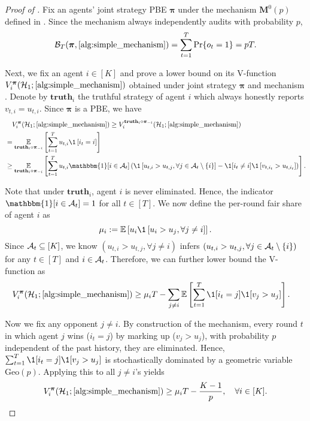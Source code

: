 \begin{proof}[Proof of ]
Fix an agents' joint strategy PBE $\bm \pi$ under the mechanism $\bm M^0(p)$ defined in . Since the mechanism always independently audits with probability $p$,
\begin{equation*}
    \mathcal B_T(\bm \pi,\text{\Cref{alg:simple_mechanism}}) = \sum_{t=1}^T \Pr\{o_t=1\} = pT.
\end{equation*}

Next, we fix an agent $i\in [K]$ and prove a lower bound on its V-function $V_i^{\bm\pi}(\mH_1;\text{\Cref{alg:simple_mechanism}})$ obtained under joint strategy $\bm \pi$ and mechanism . Denote by $\textbf{truth}_i$ the truthful strategy of agent $i$ which always honestly reports $v_{t,i}=u_{t,i}$. Since $\bm\pi$ is a PBE, we have
\begin{align*}
    &\quad V_i^{\bm\pi}(\mH_1;\text{\Cref{alg:simple_mechanism}}) \geq V_i^{\textbf{truth}_i\circ \bm{\pi}_{-i}}(\mH_1;\text{\Cref{alg:simple_mechanism}})\\
    &= \E_{\textbf{truth}_i\circ \bm{\pi}_{-i}}\sqb{ \sum_{t=1}^T u_{t,i} \1\sqb{i_t=i}  }\\
    &\geq \E_{\textbf{truth}_i\circ \bm{\pi}_{-i}}\sqb{ \sum_{t=1}^T u_{t,i} \mathbbm{1}[i\in \mA_t] \paren{\1\sqb{u_{t,i}>u_{t,j},\forall j\in \mA_t\setminus \{i\}} -  \1[i_t\neq i]\1\sqb{v_{t,i_t}>u_{t,i_t}}}}.
\end{align*}

Note that under $\textbf{truth}_i$, agent $i$ is never eliminated. Hence, the indicator $\mathbbm{1}[i\in \mA_t]=1$ for all $t\in [T]$.
We now define the per-round fair share of agent $i$ as
\begin{equation*}
    \mu_i := \E\sqb{  u_i \1\sqb{u_i>u_j,\forall j\ne i}  }.
\end{equation*}
Since $\mathcal{A}_t\subseteq [K]$, we know $(u_{t,i}>u_{t,j},\forall j\ne i)$ infers $(u_{t,i}>u_{t,j},\forall j\in \mathcal{A}_t\setminus \{i\})$ for any $t\in [T]$ and $i\in \mathcal{A}_t$. Therefore, we can further lower bound the V-function as
\begin{align*}
    V_i^{\bm\pi}(\mH_1;\text{\Cref{alg:simple_mechanism}}) &\geq \mu_i T - \sum_{j\neq i}\E \sqb{\sum_{t=1}^T \1[i_t=j] \1[v_j>u_j]}.
\end{align*}

Now we fix any opponent $j\neq i$. By construction of the mechanism, every round $t$ in which agent $j$ wins ($i_t=j$) by marking up ($v_j>u_j$), with probability $p$ independent of the past history, they are eliminated. Hence, $\sum_{t=1}^T \1[i_t=j] \1[v_j>u_j]$ is stochastically dominated by a geometric variable $\text{Geo}(p)$. Applying this to all $j\ne i$'s yields
\begin{equation*}
V_i^{\bm\pi}(\mH_1;\text{\Cref{alg:simple_mechanism}}) \geq \mu_i T - \frac{K-1}{p},\quad \forall i\in [K].
\end{equation*}


\end{proof}
